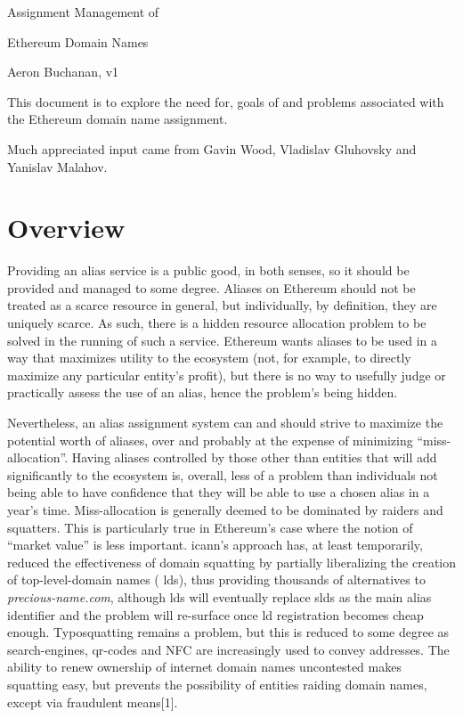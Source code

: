 \documentclass[10pt,a4paper]{article}
\begin{document}
\def\ether{Ether\xspace}
\def\ie{{i.e.}\xspace}
\def\eg{{e.g.}\xspace}
\def\tld{{\sc tld}}
\def\tlds{{\sc tld}s\xspace}
\def\slds{{\sc sld}s\xspace}
\def\icann{{\sc icann}\xspace}
\def\qrcode{{\sc qr}-code\xspace}
\def\qrcodes{{\sc qr}-codes\xspace}
\def\nfc{{\sc nfc}\xspace}
\def\dapp{{\sc da}pp\xspace}
\def\dapps{{\sc da}pps\xspace}

\begin{center}
{\huge Assignment Management of 

Ethereum Domain Names}

{\small Aeron Buchanan, v1}
\end{center}

This document is to explore the need for, goals of and problems associated with the Ethereum domain name assignment.

Much appreciated input came from Gavin Wood, Vladislav Gluhovsky and Yanislav Malahov.

\section*{Overview}

Providing an alias service is a public good, in both senses, so it should be provided and managed to some degree. Aliases on Ethereum should not be treated as a scarce resource in general, but individually, by definition, they are uniquely scarce. As such, there is a hidden resource allocation problem to be solved in the running of such a service. Ethereum wants aliases to be used in a way that maximizes utility to the ecosystem (not, for example, to directly maximize any particular entity's profit), but there is no way to usefully judge or practically assess the use of an alias, hence the problem's being hidden. 

Nevertheless, an alias assignment system can and should strive to maximize the potential worth of aliases, over and probably at the expense of minimizing ``miss-allocation''. Having aliases controlled by those other than entities that will add significantly to the ecosystem is, overall, less of a problem than individuals not being able to have confidence that they will be able to use a chosen alias in a year's time. Miss-allocation is generally deemed to be dominated by raiders and squatters. This is particularly true in Ethereum's case where the notion of ``market value'' is less important. \icann's approach has, at least temporarily, reduced the effectiveness of domain squatting by partially liberalizing the creation of top-level-domain names (	lds), thus providing thousands of alternatives to {\it precious-name.com}, although 	lds will eventually replace \slds as the main alias identifier and the problem will re-surface once 	ld registration becomes cheap enough. Typosquatting remains a problem, but this is reduced to some degree as search-engines, \qrcodes and NFC are increasingly used to convey addresses. The ability to renew ownership of internet domain names uncontested makes squatting easy, but prevents the possibility of entities raiding domain names, except via fraudulent means[1].
\end{document}

